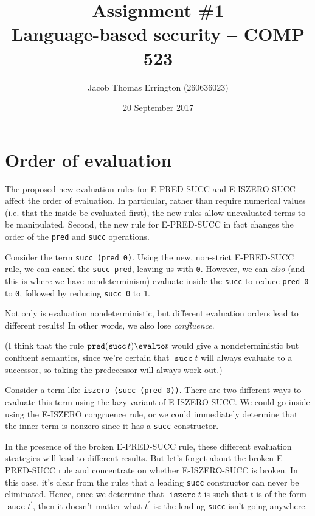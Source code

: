 \documentclass[11pt,letterpaper]{article}
\author{Jacob Thomas Errington (260636023)}
\title{Assignment \#1\\Language-based security -- COMP 523}
\date{20 September 2017}
\begin{document}
\maketitle

\section{Order of evaluation}

The proposed new evaluation rules for E-PRED-SUCC and E-ISZERO-SUCC affect the
order of evaluation. In particular, rather than require numerical values (i.e.
that the inside be evaluated first), the new rules allow unevaluated terms to
be manipulated. Second, the new rule for E-PRED-SUCC in fact changes the order
of the \texttt{pred} and \texttt{succ} operations.

\begin{description}
    \newcommand{\Succ}{\operatorname{\mathtt{succ}}}
    \newcommand{\Pred}{\operatorname{\mathtt{pred}}}
    \newcommand{\iszero}{\operatorname{\mathtt{iszero}}}
    \item[E-PRED-SUCC.]
        Consider the term \texttt{succ (pred 0)}.
        Using the new, non-strict E-PRED-SUCC rule, we can cancel the
        \texttt{succ pred}, leaving us with \texttt{0}.
        However, we can \emph{also} (and this is where we have nondeterminism)
        evaluate inside the \texttt{succ} to reduce \texttt{pred 0} to
        \texttt{0}, followed by reducing \texttt{succ 0} to \texttt{1}.

        Not only is evaluation nondeterministic, but different evaluation
        orders lead to different results! In other words, we also lose
        \emph{confluence}.

        (I think that the rule $\Pred (\Succ t) \evalto t$  would give a
        nondeterministic but confluent semantics, since we're certain that
        $\Succ t$ will always evaluate to a successor, so taking the
        predecessor will always work out.)

    \item[E-ISZERO-SUCC.]
        Consider a term like \texttt{iszero (succ (pred 0))}.
        There are two different ways to evaluate this term using the lazy
        variant of E-ISZERO-SUCC. We could go inside using the E-ISZERO
        congruence rule, or we could immediately determine that the inner term
        is nonzero since it has a \texttt{succ} constructor.

        In the presence of the broken E-PRED-SUCC rule, these different
        evaluation strategies will lead to different results. But let's forget
        about the broken E-PRED-SUCC rule and concentrate on whether
        E-ISZERO-SUCC is broken. In this case, it's clear from the rules that
        a leading \texttt{succ} constructor can never be eliminated. Hence,
        once we determine that $\iszero t$ is such that $t$ is of
        the form $\Succ t^\prime$, then it doesn't matter what $t^\prime$ is:
        the leading \texttt{succ} isn't going anywhere.


\end{description}
\end{document}
